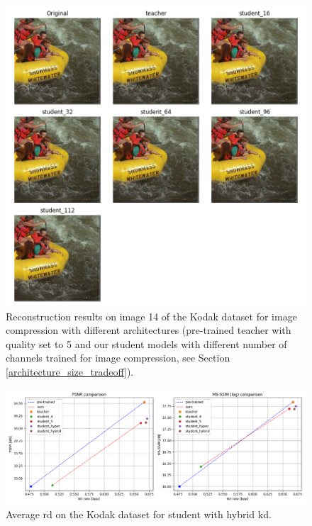 \documentclass{article}
\begin{document}
\begin{figure}
  \centering
  \includegraphics[width=15cm]{kd_lic_kodak_14.png}
  \caption[Reconstruction results on image 14 of the Kodak dataset for image compression with different architectures.]{Reconstruction results on image 14 of the Kodak dataset for image compression with different architectures (pre-trained teacher with \textsf{quality} set to 5 and our student models with different number of channels trained for image compression, see Section \ref{architecture_size_tradeoff}).}
  \label{appendix:kd_lic_2:a}
\end{figure}

\begin{figure}
    \centering
    \includegraphics[width=15cm]{kd_lic_hyper_hybrid_rd_lambda_1.png}
    \caption[Average \acrshort{rd} on the Kodak dataset for student with hybrid \acrshort{kd}.]{Average \acrshort{rd} on the Kodak dataset for student with hybrid \acrshort{kd}.}
    \label{kd_lic_8}
\end{figure}
\end{document}
